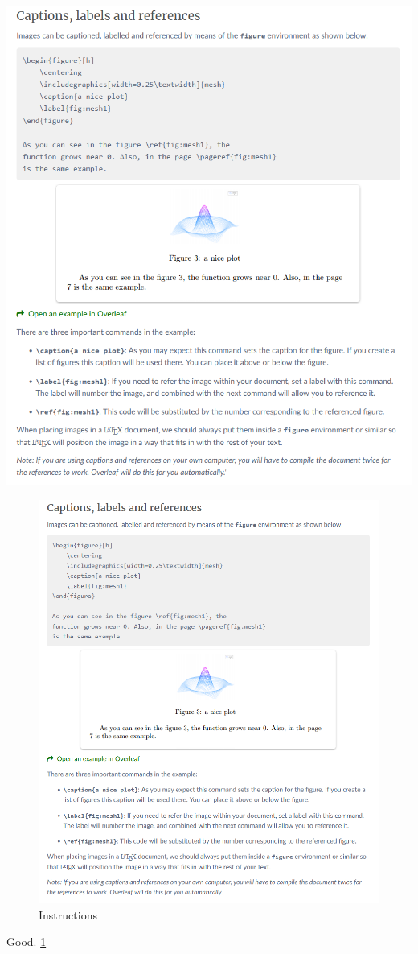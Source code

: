 \documentclass[12pt, letterpaper, twoside]{article}    %
\begin{document}
\includegraphics[width=\textwidth]{ravnanjeSSlikami}


\begin{figure}[h]
    \centering
    \includegraphics[width=1.25\textwidth]{ravnanjeSSlikami}
    \caption{Instructions}
    \label{fig:inst1}
    
\end{figure}

Good. \ref{fig:inst1}
\end{document}
